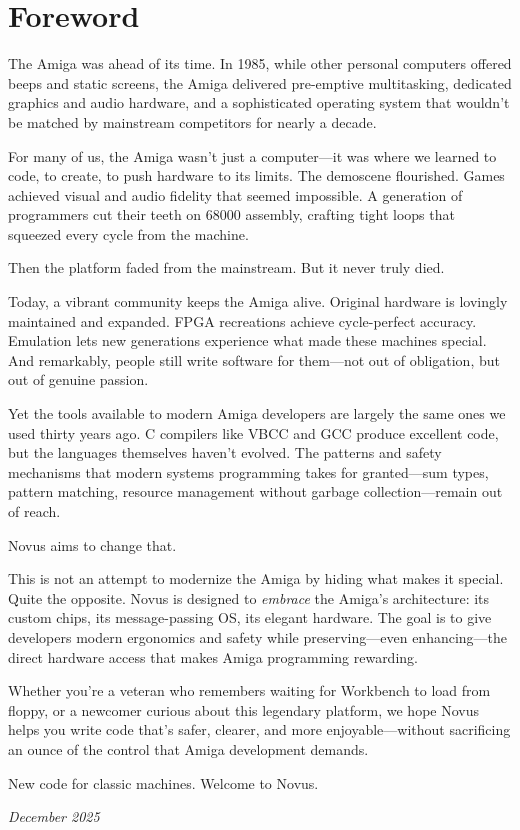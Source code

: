 \chapter*{Foreword}

The Amiga was ahead of its time. In 1985, while other personal computers offered beeps and static screens, the Amiga delivered pre-emptive multitasking, dedicated graphics and audio hardware, and a sophisticated operating system that wouldn't be matched by mainstream competitors for nearly a decade.

For many of us, the Amiga wasn't just a computer—it was where we learned to code, to create, to push hardware to its limits. The demoscene flourished. Games achieved visual and audio fidelity that seemed impossible. A generation of programmers cut their teeth on 68000 assembly, crafting tight loops that squeezed every cycle from the machine.

Then the platform faded from the mainstream. But it never truly died.

Today, a vibrant community keeps the Amiga alive. Original hardware is lovingly maintained and expanded. FPGA recreations achieve cycle-perfect accuracy. Emulation lets new generations experience what made these machines special. And remarkably, people still write software for them—not out of obligation, but out of genuine passion.

Yet the tools available to modern Amiga developers are largely the same ones we used thirty years ago. C compilers like VBCC and GCC produce excellent code, but the languages themselves haven't evolved. The patterns and safety mechanisms that modern systems programming takes for granted—sum types, pattern matching, resource management without garbage collection—remain out of reach.

Novus aims to change that.

This is not an attempt to modernize the Amiga by hiding what makes it special. Quite the opposite. Novus is designed to \emph{embrace} the Amiga's architecture: its custom chips, its message-passing OS, its elegant hardware. The goal is to give developers modern ergonomics and safety while preserving—even enhancing—the direct hardware access that makes Amiga programming rewarding.

Whether you're a veteran who remembers waiting for Workbench to load from floppy, or a newcomer curious about this legendary platform, we hope Novus helps you write code that's safer, clearer, and more enjoyable—without sacrificing an ounce of the control that Amiga development demands.

New code for classic machines. Welcome to Novus.

\vspace{2em}
\hfill\textit{December 2025}
